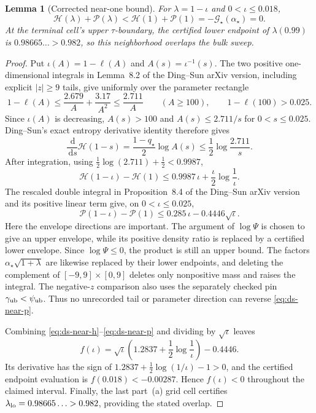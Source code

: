 \documentclass[11pt]{article}
\newtheorem{lemma}[theorem]{Lemma}
\newcommand{\sG}{\mathscr{G}}
\newcommand{\dd}{\,\mathrm{d}}
\begin{document}
\begin{lemma}[Corrected near-one bound]\label{lem:ds-near-one}
For $\lambda=1-\iota$ and $0<\iota\le0.018$,
\[
  \mathcal H(\lambda)+\mathcal P(\lambda)
  <\mathcal H(1)+\mathcal P(1)
  =-\sG_\star(\alpha_\star)=0.
\]
At the terminal cell's upper $\tau$-boundary, the certified lower endpoint of
$\lambda(0.99)$ is $0.98665\ldots>0.982$, so this neighborhood overlaps the
bulk sweep.
\end{lemma}
\begin{proof}
Put $\iota(A)=1-\ell(A)$ and $A(s)=\iota^{-1}(s)$.  The two positive
one-dimensional integrals in Lemma~8.2 of the Ding--Sun arXiv version, including explicit
$|z|\ge9$ tails, give uniformly over the parameter rectangle
\[
  1-\ell(A)\le \frac{2.679}{A}+\frac{3.17}{A^2}
  \le\frac{2.711}{A}\qquad(A\ge100),
  \qquad 1-\ell(100)>0.025.
\]
Since $\iota(A)$ is decreasing, $A(s)>100$ and $A(s)\le2.711/s$ for
$0<s\le0.025$.  Ding--Sun's exact entropy derivative identity therefore
gives
\[
 \frac{\dd}{\dd s}\mathcal H(1-s)
 =\frac{1-q_\star}{2}\log A(s)
 \le\frac12\log\frac{2.711}{s}.
\]
After integration, using
$\tfrac12\log(2.711)+\tfrac12<0.9987$,
\begin{equation}\label{eq:ds-near-h}
 \mathcal H(1-\iota)-\mathcal H(1)
 \le0.9987\,\iota+\frac{\iota}{2}\log\frac1\iota.
\end{equation}
The rescaled double integral in Proposition~8.4 of the Ding--Sun arXiv version and its positive
linear term give, on $0<\iota\le0.025$,
\begin{equation}\label{eq:ds-near-p}
 \mathcal P(1-\iota)-\mathcal P(1)
 \le0.285\,\iota-0.4446\sqrt\iota.
\end{equation}
Here the envelope directions are important.  The argument of $\log\Psi$ is
chosen to give an upper envelope, while its positive density ratio is replaced
by a certified lower envelope.  Since $\log\Psi\le0$, the product is still an
upper bound.  The factors $\alpha_\star\sqrt{1+\lambda}$ are likewise replaced
by their lower endpoints, and deleting the complement of
$[-9,9]\times[0,9]$ deletes only nonpositive mass and raises the integral.
The negative-$z$ comparison also uses the separately checked pin
$\gamma_{\rm ub}<\psi_{\rm ub}$.  Thus no unrecorded tail or parameter
direction can reverse \eqref{eq:ds-near-p}.

Combining \eqref{eq:ds-near-h}--\eqref{eq:ds-near-p} and dividing by
$\sqrt\iota$ leaves
\[
 f(\iota)=\sqrt\iota\left(1.2837+\frac12\log\frac1\iota\right)-0.4446.
\]
Its derivative has the sign of
$1.2837+\tfrac12\log(1/\iota)-1>0$, and the certified endpoint evaluation is
$f(0.018)<-0.00287$.  Hence $f(\iota)<0$ throughout the claimed interval.
Finally, the last part~(a) grid cell certifies
$\lambda_{\rm lo}=0.98665\ldots>0.982$, providing the stated overlap.
\end{proof}
\end{document}
